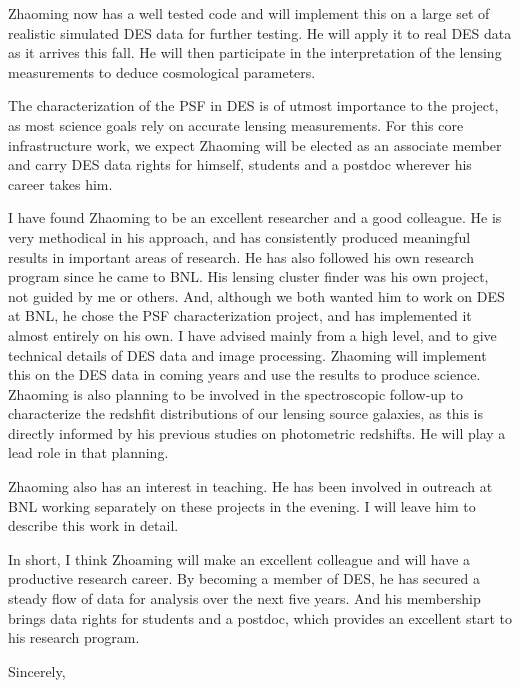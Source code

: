 \documentclass[12pt]{letter}
\begin{document}
\begin{letter}{}
Zhaoming now has a well tested code and will implement this on a large set of
realistic simulated DES data for further testing. He will apply it to real DES
data as it arrives this fall.  He will then participate in the interpretation
of the lensing measurements to deduce cosmological parameters.

The characterization of the PSF in DES is of utmost importance to the project,
as most science goals rely on accurate lensing measurements.  For this core
infrastructure work, we expect Zhaoming will be elected as an associate member
and carry DES data rights for himself, students and a postdoc wherever his
career takes him.

I have found Zhaoming to be an excellent researcher and a good colleague.  He
is very methodical in his approach, and has consistently produced meaningful
results in important areas of research.  He has also followed his own research
program since he came to BNL.  His lensing cluster finder was his own project,
not guided by me or others.  And, although we both wanted him to work on DES at
BNL, he chose the PSF characterization project, and has implemented it almost
entirely on his own.  I have advised mainly from a high level, and to give
technical details of DES data and image processing.  Zhaoming will implement
this on the DES data in coming years and use the results to produce science.
Zhaoming is also planning to be involved in the spectroscopic follow-up to
characterize the redshfit distributions of our lensing source galaxies, as this
is directly informed by his previous studies on photometric redshifts.  He will
play a lead role in that planning.

Zhaoming also has an interest in teaching.  He has been involved in outreach at
BNL working separately on these projects in the evening.  I will leave him to
describe this work in detail.

In short, I think Zhoaming will make an excellent colleague and will have a
productive research career.  By becoming a member of DES, he has secured
a steady flow of data for analysis over the next five years. And his 
membership brings data rights for students and a postdoc, which provides
an excellent start to his research program.

\closing{Sincerely, }

\end{letter}
\end{document}

